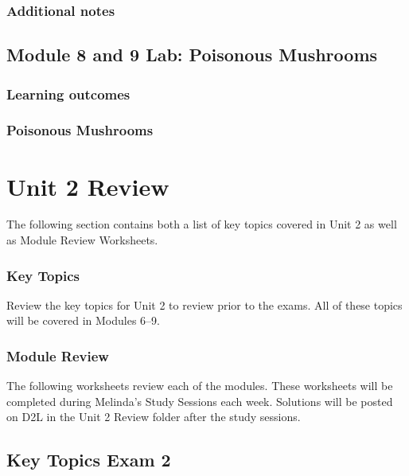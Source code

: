 \documentclass[
]{report}
\begin{document}
\subsection{Additional notes}\label{additional-notes-19}

\section{Module 8 and 9 Lab: Poisonous Mushrooms}\label{module-8-and-9-lab-poisonous-mushrooms}

\subsection{Learning outcomes}\label{learning-outcomes-22}

\subsection{Poisonous Mushrooms}\label{poisonous-mushrooms}

\chapter{Unit 2 Review}\label{unit-2-review}

The following section contains both a list of key topics covered in Unit 2 as well as Module Review Worksheets.

\subsection{Key Topics}\label{key-topics-9}

Review the key topics for Unit 2 to review prior to the exams. All of these topics will be covered in Modules 6--9.

\subsection{Module Review}\label{module-review-1}


The following worksheets review each of the modules. These worksheets will be completed during Melinda's Study Sessions each week. Solutions will be posted on D2L in the Unit 2 Review folder after the study sessions.

\newpage

\section{Key Topics Exam 2}\label{key-topics-exam-2}
\end{document}
